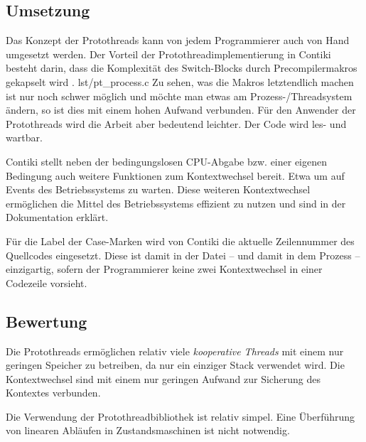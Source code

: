 \subsection{Umsetzung}
	Das Konzept der Protothreads kann von jedem Programmierer auch von Hand
	umgesetzt werden.  Der Vorteil der Protothreadimplementierung in
	Contiki besteht darin, dass die Komplexität des Switch-Blocks
	durch Precompilermakros gekapselt wird .
			{lst/pt_process.c}
	Zu sehen, was die Makros letztendlich machen ist nur noch schwer
	möglich und möchte man etwas am Prozess-/Threadsystem ändern, so ist
	dies mit einem hohen Aufwand verbunden.  Für den Anwender der
	Protothreads wird die Arbeit aber bedeutend leichter.  Der Code wird
	les- und wartbar.

	Contiki stellt neben der bedingungslosen CPU-Abgabe bzw. einer eigenen
	Bedingung auch weitere Funktionen zum Kontextwechsel bereit.
	Etwa um auf Events  des Betriebssystems zu
	warten.  Diese weiteren Kontextwechsel ermöglichen die Mittel des
	Betriebssystems effizient zu nutzen und sind in der Dokumentation
	\parencite[siehe][Contiki processes]{Contiki:Doc}
	erklärt.

	Für die Label der Case-Marken wird von Contiki die aktuelle
	Zeilennummer des Quellcodes eingesetzt.  Diese ist damit in der Datei
	-- und damit in dem Prozess -- einzigartig, sofern der Programmierer
	keine zwei Kontextwechsel in einer Codezeile vorsieht.


\subsection{Bewertung}
	Die Protothreads ermöglichen relativ viele \emph{kooperative
	Threads} mit einem nur geringen Speicher zu betreiben, da nur ein
	einziger Stack verwendet wird.	Die Kontextwechsel sind mit einem
	nur geringen Aufwand zur Sicherung des Kontextes verbunden.

	Die Verwendung der Protothreadbibliothek ist relativ simpel.
	Eine Überführung von linearen Abläufen in Zustandsmaschinen ist
	nicht notwendig.

